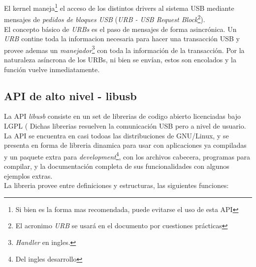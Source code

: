 El kernel maneja\footnote{Si bien es la forma mas recomendada, puede evitarse
el uso de esta API} el acceso de los distintos drivers al sistema USB mediante
mensajes de \emph{pedidos de bloques USB} (\emph{URB - USB Request
Block}\footnote{El acronimo \emph{URB} se usar\'a en el documento por
cuestiones pr\'acticas}).\\

El concepto b\'asico de \emph{URBs} es el paso de mensajes de forma
asincr\'onica. 
Un \emph{URB} contine toda la informacion necesaria para hacer una
transacci\'on USB y provee ademas un \emph{manejador}\footnote{\emph{Handler}
en ingles.} con toda la informaci\'on de la transacci\'on.
Por la naturaleza as\'incrona de los URBs, ni bien se env\'ian, estos son
encolados y la funci\'on vuelve inmediatamente. 



\subsection{API de alto nivel - libusb}

La API \emph{libusb} consiste en un set de librerias de codigo abierto
licenciadas bajo LGPL (%
Dichas librerias resuelven la comunicaci\'on USB pero a nivel de usuario.
La API se encuentra en casi todoas las distribuciones de GNU/Linux, y se
presenta en forma de libreria dinamica para usar con aplicaciones ya
compiladas y un paquete extra para \emph{development}\footnote{Del ingles
desarrollo}, con los archivos cabecera, programas para compilar, y
la documentaci\'on completa de sus funcionalidades con algunos ejemplos
extras. \\

La libreria provee entre definiciones y estructuras, las siguientes funciones:



